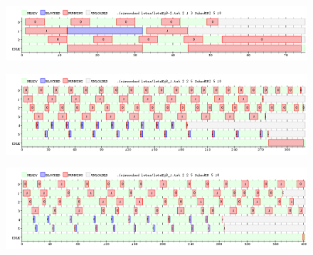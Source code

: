 \begin{figure}[H]
  \centering
  \includegraphics[width=1\textwidth]{img/imgEj8-2}
  \caption{}
  \label{fig:ej8-2}
\end{figure}



\begin{figure}[H]
  \centering
  \includegraphics[width=1\textwidth]{img/imgEj8-3}
  \caption{}
  \label{fig:ej8-3}
\end{figure}



\begin{figure}[H]
  \centering
  \includegraphics[width=1\textwidth]{img/imgEj8-4}
  \caption{}
  \label{fig:ej8-4}
\end{figure}











